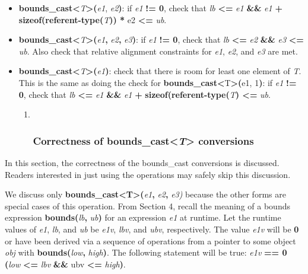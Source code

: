 \documentclass[]{article}
\begin{document}
\begin{itemize}
\item
  \textbf{bounds\_cast\textless{}}\emph{T}\textbf{\textgreater{}(}\emph{e1},
  \emph{e2}\textbf{)}: if \emph{e1} \textbf{!= 0}, check that \emph{lb}
  \textbf{\textless{}=} \emph{e1} \textbf{\&\&} \emph{e1} \textbf{+
  sizeof(referent-type(}\emph{T}\textbf{)) *} e2 \textbf{\textless{}=}
  \emph{ub}.
\item
  \textbf{bounds\_cast\textless{}}\emph{T}\textbf{\textgreater{}(}\emph{e1}\textbf{,}
  \emph{e2}\textbf{,} \emph{e3}\textbf{)}: if \emph{e1} \textbf{!= 0},
  check that \emph{lb} \textbf{\textless{}=} \emph{e2} \textbf{\&\&}
  \emph{e3} \textbf{\textless{}=} \emph{ub}. Also check that relative
  alignment constraints for \emph{e1}, \emph{e2}, and \emph{e3} are met.
\item
  \textbf{bounds\_cast\textless{}}\emph{T}\textbf{\textgreater{}(}\emph{e1}\textbf{)}:
  check that there is room for least one element of \emph{T}. This is
  the same as doing the check for
  \textbf{bounds\_cast\textless{}}T\textbf{\textgreater{}(}e1,
  1\textbf{)}: if \emph{e1} \textbf{!=} \textbf{0}, check that \emph{lb}
  \textbf{\textless{}=} \emph{e1} \textbf{\&\&} \emph{e1} \textbf{+}
  \textbf{sizeof(referent-type(}\emph{T}\textbf{) \textless{}=}
  \emph{ub}.

  \begin{enumerate}
  \def\labelenumi{\arabic{enumi}.}
  \item ~
    \subsubsection{\texorpdfstring{\protect\hypertarget{ux5fToc437460798}{}{\protect\hypertarget{ux5fToc440445479}{}{\protect\hypertarget{ux5fToc440449261}{}{\protect\hypertarget{ux5fToc440551911}{}{}}}}Correctness
    of bounds\_cast\textless{}\emph{T}\textgreater{}
    conversions}{Correctness of bounds\_cast\textless{}T\textgreater{} conversions}}\label{correctness-of-boundsux5fcastt-conversions}
  \end{enumerate}
\end{itemize}

In this section, the correctness of the bounds\_cast conversions is
discussed. Readers interested in just using the operations may safely
skip this discussion.

We discuss only
\textbf{bounds\_cast\textless{}T\textgreater{}(}\emph{e1}\textbf{,}
\emph{e2}\textbf{,} \emph{e3)} because the other forms are special cases
of this operation. From Section 4, recall the meaning of a bounds
expression \textbf{bounds(}\emph{lb}\textbf{,} \emph{ub}\textbf{)} for
an expression \emph{e1} at runtime. Let the runtime values of \emph{e1},
\emph{lb}, and \emph{ub} be \emph{e1v}, \emph{lbv}, and \emph{ubv},
respectively. The value \emph{e1v} will be \textbf{0} or have been
derived via a sequence of operations from a pointer to some object
\emph{obj} with \textbf{bounds(}\emph{low}\textbf{,}
\emph{high}\textbf{)}. The following statement will be true: \emph{e1v}
\textbf{== 0 \textbar{}\textbar{} (}\emph{low} \textbf{\textless{}=}
\emph{lbv} \textbf{\&\&} ubv \textbf{\textless{}=}
\emph{high}\textbf{)}.
\end{document}
